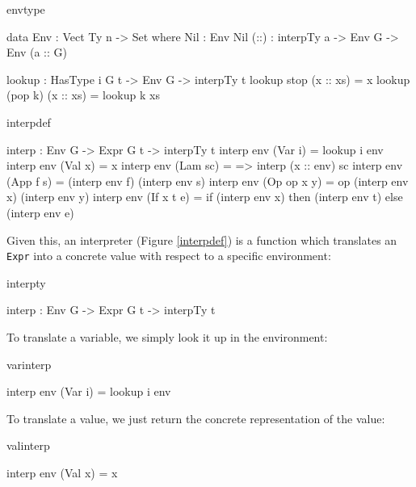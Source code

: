\begin{SaveVerbatim}{envtype}

data Env : Vect Ty n -> Set where
    Nil  : Env Nil
    (::) : interpTy a -> Env G -> Env (a :: G)

lookup : HasType i G t -> Env G -> interpTy t
lookup stop    (x :: xs) = x
lookup (pop k) (x :: xs) = lookup k xs

\end{SaveVerbatim}

\begin{SaveVerbatim}{interpdef}

interp : Env G -> Expr G t -> interpTy t
interp env (Var i)     = lookup i env
interp env (Val x)     = x
interp env (Lam sc)    = \x => interp (x :: env) sc
interp env (App f s)   = (interp env f) (interp env s)
interp env (Op op x y) = op (interp env x) (interp env y)
interp env (If x t e)  = if (interp env x) then (interp env t) 
                                           else (interp env e)

\end{SaveVerbatim}

\noindent
Given this, an interpreter (Figure \ref{interpdef})
is a function which translates an \texttt{Expr} into a
concrete \Idris{} value with respect to a specific environment:

\begin{SaveVerbatim}{interpty}

interp : Env G -> Expr G t -> interpTy t

\end{SaveVerbatim}

\noindent
To translate a variable, we simply look it up in the environment:

\begin{SaveVerbatim}{varinterp}

interp env (Var i) = lookup i env

\end{SaveVerbatim}

\noindent
To translate a value, we just return the concrete representation of the value:

\begin{SaveVerbatim}{valinterp}

interp env (Val x) = x

\end{SaveVerbatim}

